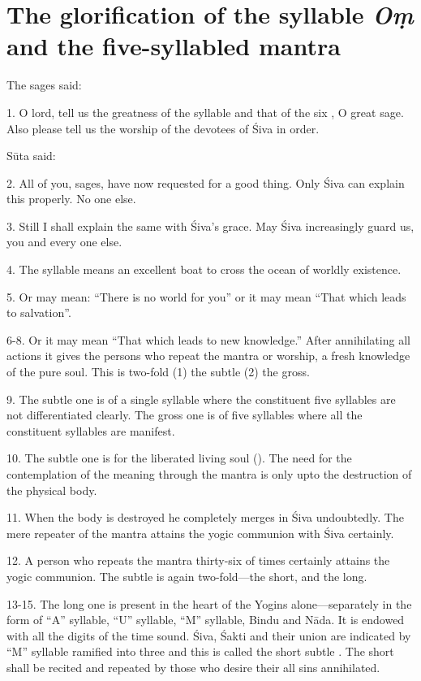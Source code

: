 \chapter{The glorification of the syllable \emph{Oṃ} and the five-syllabled mantra}

The sages said:

1. O lord, tell us the greatness of the syllable  and that of the six
, O great sage. Also please tell us the worship of the devotees of
Śiva in order.

Sūta said:

2. All of you, sages, have now requested for a good thing. Only Śiva can explain
this properly. No one else.

3. Still I shall explain the same with Śiva’s grace. May Śiva increasingly guard
us, you and every one else.

4. The syllable  means an excellent boat to cross the ocean of worldly
existence.

5. Or  may mean: “There is no world for you” or it may mean “That
which leads to salvation”.

6-8. Or it may mean “That which leads to new knowledge.” After annihilating all
actions it gives the persons who repeat the mantra or worship, a fresh knowledge
of the pure soul. This  is two-fold (1) the subtle (2) the gross.

9. The subtle one is of a single syllable where the constituent five syllables
are not differentiated clearly. The gross one is of five syllables where all
the constituent syllables are manifest.

10. The subtle one is for the liberated living soul (). The need
for the contemplation of the meaning through the mantra is only upto
the destruction of the physical body.

11. When the body is destroyed he completely merges in Śiva undoubtedly.
The mere repeater of the mantra attains the yogic communion with Śiva certainly.

12. A person who repeats the mantra thirty-six  of times certainly
attains the yogic communion. The subtle  is again two-fold—the short,
and the long.

13-15. The long one is present in the heart of the Yogins alone—separately in
the form of “A” syllable, “U” syllable, “M” syllable, Bindu and Nāda. It is
endowed with all the digits of the time sound. Śiva, Śakti and their union are
indicated by “M” syllable ramified into three and this is called the short
subtle . The short  shall be recited and repeated by
those who desire their all sins annihilated.

